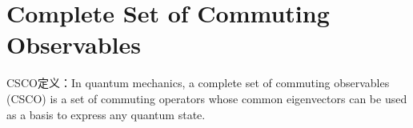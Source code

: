 \section{Complete Set of Commuting Observables}
CSCO定义：In quantum mechanics, a complete set of commuting observables (CSCO) is a set of commuting operators whose common eigenvectors can be used as a basis to express any quantum state. 